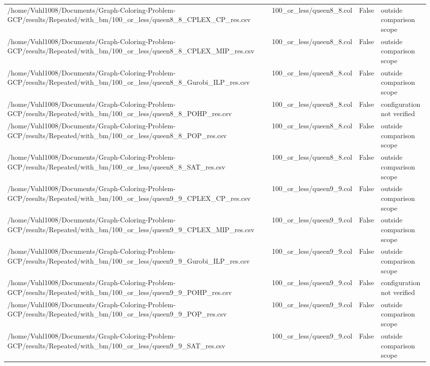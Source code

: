 \begin{table}[htbp]
\begin{tabular}{llll}
/home/Vuhl1008/Documents/Graph-Coloring-Problem-GCP/results/Repeated/with\_bm/100\_or\_less/queen8\_8\_CPLEX\_CP\_res.csv & 100\_or\_less/queen8\_8.col & False & outside comparison scope \\
/home/Vuhl1008/Documents/Graph-Coloring-Problem-GCP/results/Repeated/with\_bm/100\_or\_less/queen8\_8\_CPLEX\_MIP\_res.csv & 100\_or\_less/queen8\_8.col & False & outside comparison scope \\
/home/Vuhl1008/Documents/Graph-Coloring-Problem-GCP/results/Repeated/with\_bm/100\_or\_less/queen8\_8\_Gurobi\_ILP\_res.csv & 100\_or\_less/queen8\_8.col & False & outside comparison scope \\
/home/Vuhl1008/Documents/Graph-Coloring-Problem-GCP/results/Repeated/with\_bm/100\_or\_less/queen8\_8\_POHP\_res.csv & 100\_or\_less/queen8\_8.col & False & configuration not verified \\
/home/Vuhl1008/Documents/Graph-Coloring-Problem-GCP/results/Repeated/with\_bm/100\_or\_less/queen8\_8\_POP\_res.csv & 100\_or\_less/queen8\_8.col & False & outside comparison scope \\
/home/Vuhl1008/Documents/Graph-Coloring-Problem-GCP/results/Repeated/with\_bm/100\_or\_less/queen8\_8\_SAT\_res.csv & 100\_or\_less/queen8\_8.col & False & outside comparison scope \\
/home/Vuhl1008/Documents/Graph-Coloring-Problem-GCP/results/Repeated/with\_bm/100\_or\_less/queen9\_9\_CPLEX\_CP\_res.csv & 100\_or\_less/queen9\_9.col & False & outside comparison scope \\
/home/Vuhl1008/Documents/Graph-Coloring-Problem-GCP/results/Repeated/with\_bm/100\_or\_less/queen9\_9\_CPLEX\_MIP\_res.csv & 100\_or\_less/queen9\_9.col & False & outside comparison scope \\
/home/Vuhl1008/Documents/Graph-Coloring-Problem-GCP/results/Repeated/with\_bm/100\_or\_less/queen9\_9\_Gurobi\_ILP\_res.csv & 100\_or\_less/queen9\_9.col & False & outside comparison scope \\
/home/Vuhl1008/Documents/Graph-Coloring-Problem-GCP/results/Repeated/with\_bm/100\_or\_less/queen9\_9\_POHP\_res.csv & 100\_or\_less/queen9\_9.col & False & configuration not verified \\
/home/Vuhl1008/Documents/Graph-Coloring-Problem-GCP/results/Repeated/with\_bm/100\_or\_less/queen9\_9\_POP\_res.csv & 100\_or\_less/queen9\_9.col & False & outside comparison scope \\
/home/Vuhl1008/Documents/Graph-Coloring-Problem-GCP/results/Repeated/with\_bm/100\_or\_less/queen9\_9\_SAT\_res.csv & 100\_or\_less/queen9\_9.col & False & outside comparison scope \\

\end{tabular}
\end{table}
